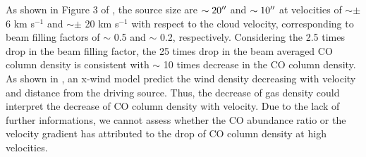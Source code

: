 As shown in Figure 3 of \citet{2009ApJ...696...66Q}, the source size are $\sim 20\mbox{$^{\prime\prime}$}$ and $\sim 10\mbox{$^{\prime\prime}$}$ at velocities of $\sim \pm$ 6 km s$^{-1}$ and $\sim \pm$ 20 km s$^{-1}$ with respect to the cloud velocity, corresponding to beam filling factors of $\sim$ 0.5 and $\sim$ 0.2, respectively. Considering the 2.5 times drop in the beam filling factor, the 25 times drop in the beam averaged CO column density is consistent with $\sim$ 10 times decrease in the CO column density. As shown in \citet{1995ApJ...455L.155S}, an x-wind model predict the wind density decreasing with velocity and distance from the driving source. Thus, the decrease of gas density could interpret the decrease of CO column density with velocity. Due to the lack of further informations, we cannot assess whether the CO abundance ratio or the velocity gradient has attributed to the drop of CO column density at high velocities.